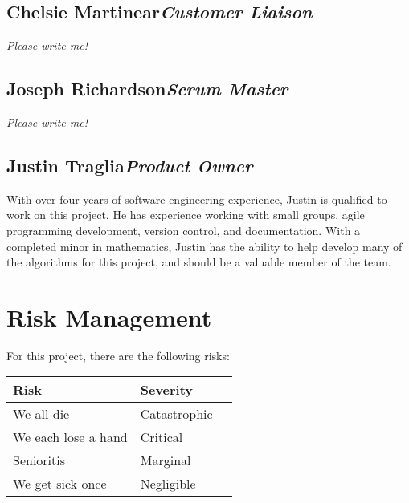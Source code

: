 \documentclass[12pt]{article}
\begin{document}
\subsection{Chelsie Martinear\hfill\textit{Customer Liaison}}

\textit{Please write me!}

\subsection{Joseph Richardson\hfill\textit{Scrum Master}}

\textit{Please write me!}

\subsection{Justin Traglia\hfill\textit{Product Owner}}

With over four years of software engineering experience, Justin is qualified to
work on this project. He has experience working with small groups, agile
programming development, version control, and documentation. With a completed
minor in mathematics, Justin has the ability to help develop many of the
algorithms for this project, and should be a valuable member of the team.


\section{Risk Management}

For this project, there are the following risks:

%
%

\begin{center}
\begin{tabularx}{\textwidth}{|X|l|l|}
    \hline \textbf{Risk} & \textbf{Severity} \\
    \hline We all die & \color{Red}Catastrophic \\
    \hline We each lose a hand & \color{Orange}Critical \\
    \hline Senioritis & \color{Yellow}Marginal \\
    \hline We get sick once & \color{Green}Negligible \\
    \hline
\end{tabularx}
\end{center}
\end{document}
